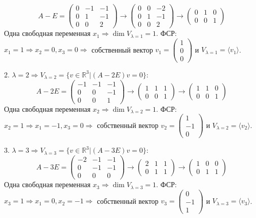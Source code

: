 \documentclass{article}
\begin{document}
$$A-E=\left(\begin{array}{rrr}0 & -1 & -1\\0 & 1 & -1\\0 & 0 & 2\end{array}\right)\rightarrow\left(\begin{array}{rrr}0 & 0 & -2\\0 & 1 & -1\\0 & 0 & 2\end{array}\right)\rightarrow\left(\begin{array}{rrr}0 & 1 & 0\\0 & 0 & 1\end{array}\right)$$
Одна свободная переменная $x_1\Rightarrow \dim V_{\lambda=1} = 1$. ФСР: $x_1=1\Rightarrow x_2=0, x_3=0 \Rightarrow$ собственный вектор $v_1=\left(\begin{array}{r}1\\0\\0\end{array}\right)$ и $V_{\lambda=1}=\langle v_1 \rangle$.
\par
2. $\lambda=2 \Rightarrow V_{\lambda=2}=\{v\in \mathbb{R}^3|(A-2E)v=0\}$:
$$A-2E=\left(\begin{array}{rrr}-1 & -1 & -1\\0 & 0 & -1\\0 & 0 & 1\end{array}\right)\rightarrow\left(\begin{array}{rrr}1 & 1 & 1\\0 & 0 & 1\end{array}\right)\rightarrow\left(\begin{array}{rrr}1 & 1 & 0\\0 & 0 & 1\end{array}\right)$$
Одна свободная переменная $x_2\Rightarrow \dim V_{\lambda=2} = 1$. ФСР: $x_2=1\Rightarrow x_1=-1, x_3=0 \Rightarrow$ собственный вектор $v_2=\left(\begin{array}{r}1\\-1\\0\end{array}\right)$ и $V_{\lambda=2}=\langle v_2 \rangle$.
\par
3. $\lambda=3 \Rightarrow V_{\lambda=3}=\{v\in \mathbb{R}^3|(A-3E)v=0\}$:
$$A-3E=\left(\begin{array}{rrr}-2 & -1 & -1\\0 & -1 & -1\\0 & 0 & 0\end{array}\right)\rightarrow\left(\begin{array}{rrr}2 & 1 & 1\\0 & 1 & 1\end{array}\right)\rightarrow\left(\begin{array}{rrr}1 & 0 & 0\\0 & 1 & 1\end{array}\right)$$
Одна свободная переменная $x_3\Rightarrow \dim V_{\lambda=3} = 1$. ФСР: $x_3=1\Rightarrow x_1=0, x_2=-1 \Rightarrow$ собственный вектор $v_3=\left(\begin{array}{r}0\\-1\\1\end{array}\right)$ и $V_{\lambda=3}=\langle v_3 \rangle$.
\end{document}
